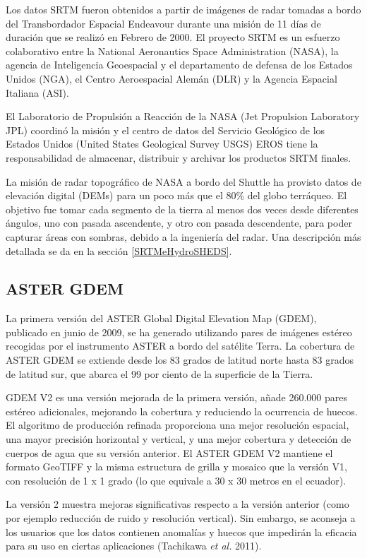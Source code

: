 \documentclass[10pt,a4paper, twoside]{report}
\begin{document}
Los datos SRTM fueron obtenidos a partir de imágenes de radar tomadas a bordo del Transbordador Espacial Endeavour durante una misión de 11 días de duración que se realizó en Febrero de 2000. El proyecto SRTM es un esfuerzo colaborativo entre la National Aeronautics Space Administration (NASA), la agencia de Inteligencia Geoespacial y el departamento de defensa de los Estados Unidos (NGA), el Centro Aeroespacial Alemán (DLR) y la Agencia Espacial Italiana (ASI). 

El Laboratorio de Propulsión a Reacción de la NASA (Jet Propulsion Laboratory JPL) coordinó la misión y el centro de datos del Servicio Geológico de los Estados Unidos (United States Geological Survey USGS) EROS tiene la responsabilidad de almacenar, distribuir y archivar los productos SRTM finales.

La misión de radar topográfico de NASA a bordo del Shuttle ha provisto datos de elevación digital (DEMs) para un poco más que el 80\% del globo terráqueo. El objetivo fue tomar cada segmento de la tierra al menos dos veces desde diferentes ángulos, uno con pasada ascendente, y otro con pasada descendente, para poder capturar áreas con sombras, debido a la ingeniería del radar. Una descripción más detallada se da en la sección \ref{SRTMeHydroSHEDS}.


\subsection{ASTER GDEM}

La primera versión del ASTER Global Digital Elevation Map (GDEM), publicado en junio de 2009, se ha generado utilizando pares de imágenes estéreo recogidas por el instrumento ASTER a bordo del satélite Terra. La cobertura de ASTER GDEM se extiende desde los 83 grados de latitud norte hasta 83 grados de latitud sur, que abarca el 99 por ciento de la superficie de la Tierra.

GDEM V2 es una versión mejorada de la primera versión, añade 260.000 pares estéreo adicionales, mejorando la cobertura y reduciendo la ocurrencia de huecos. El algoritmo de producción refinada proporciona una mejor resolución espacial, una mayor precisión horizontal y vertical, y una mejor cobertura y detección de cuerpos de agua que su versión anterior. El ASTER GDEM V2 mantiene el formato GeoTIFF y la misma estructura de grilla y mosaico que la versión V1, con resolución de 1 x 1 grado (lo que equivale a 30 x 30 metros en el ecuador).

La versión 2 muestra mejoras significativas respecto a la versión anterior (como por ejemplo reducción de ruido y resolución vertical). Sin embargo, se aconseja a los usuarios que los datos contienen anomalías y huecos que impedirán la eficacia para su uso en ciertas aplicaciones (Tachikawa \textit{et al.} 2011).
\end{document}
